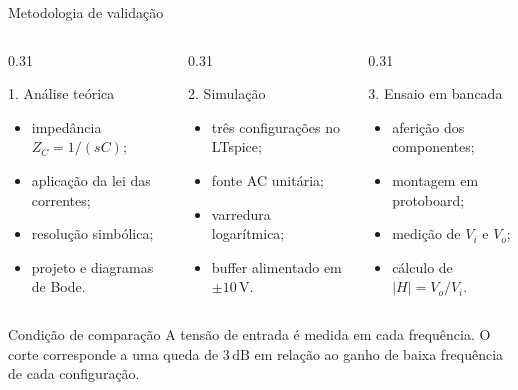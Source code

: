 \begin{frame}{Metodologia de validação}
  \small
  \begin{columns}[T,onlytextwidth]
    \begin{column}{0.31\textwidth}
      \begin{block}{1. Análise teórica}
        \begin{itemize}
          \item impedância $Z_C=1/(sC)$;
          \item aplicação da lei das correntes;
          \item resolução simbólica;
          \item projeto e diagramas de Bode.
        \end{itemize}
      \end{block}
    \end{column}
    \begin{column}{0.31\textwidth}
      \begin{block}{2. Simulação}
        \begin{itemize}
          \item três configurações no LTspice;
          \item fonte AC unitária;
          \item varredura logarítmica;
          \item buffer alimentado em $\pm10\,\mathrm{V}$.
        \end{itemize}
      \end{block}
    \end{column}
    \begin{column}{0.31\textwidth}
      \begin{block}{3. Ensaio em bancada}
        \begin{itemize}
          \item aferição dos componentes;
          \item montagem em protoboard;
          \item medição de $V_i$ e $V_o$;
          \item cálculo de $|H|=V_o/V_i$.
        \end{itemize}
      \end{block}
    \end{column}
  \end{columns}

  \begin{alertblock}{Condição de comparação}
    A tensão de entrada é medida em cada frequência.
    O corte corresponde a uma queda de $3\,\mathrm{dB}$ em relação ao ganho
    de baixa frequência de cada configuração.
  \end{alertblock}
\end{frame}
